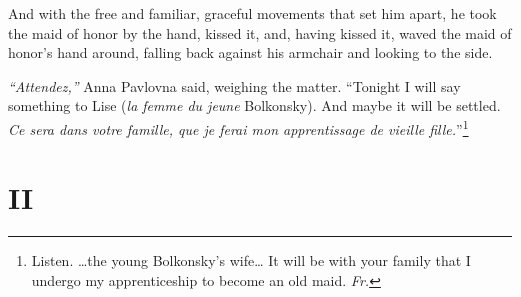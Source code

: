 And with the free and familiar, graceful movements that set him apart,
he took the maid of honor by the hand, kissed it, and, having kissed
it, waved the maid of honor's hand around, falling back against his
armchair and looking to the side.

\textit{``Attendez,''} Anna Pavlovna said, weighing the
matter. ``Tonight I will say something to Lise (\textit{la femme du
  jeune} Bolkonsky). And maybe it will be settled. \textit{Ce sera
  dans votre famille, que je ferai mon apprentissage de vieille
  fille.}''\footnote{Listen. \ldots{}the young Bolkonsky's
  wife\ldots{} It will be with your family that I undergo my
  apprenticeship to become an old maid. \textit{Fr.}}

\section*{II} %

